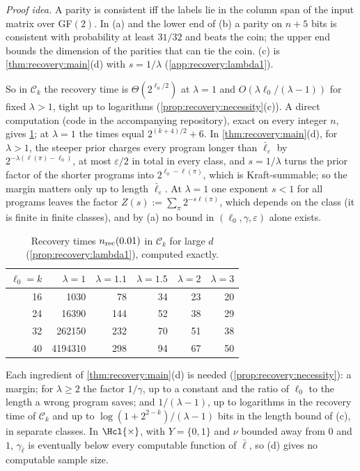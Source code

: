 \emph{Proof idea.} A parity is consistent iff the labels lie in the column span of the input matrix over GF$(2)$. In (a) and the lower end of (b) a parity on $n+5$ bits is consistent with probability at least $31/32$ and beats the coin; the upper end bounds the dimension of the parities that can tie the coin. (c) is \cref{thm:recovery:main}(d) with $s=1/\lambda$ (\cref{app:recovery:lambda1}).

So in $\mathcal C_k$ the recovery time is $\Theta(2^{\ell_0/2})$ at $\lambda=1$ and $O(\lambda\ell_0/(\lambda-1))$ for fixed $\lambda>1$, tight up to logarithms (\cref{prop:recovery:necessity}(c)). A direct computation (code in the accompanying repository), exact on every integer $n$, gives \cref{tab:recovery:times}; at $\lambda=1$ the times equal $2^{(k+4)/2}+6$. In \cref{thm:recovery:main}(d), for $\lambda>1$, the steeper prior charges every program longer than $\bar\ell_\varepsilon$ by $2^{-\lambda(\ell(\pi)-\ell_0)}$, at most $\varepsilon/2$ in total in every class, and $s=1/\lambda$ turns the prior factor of the shorter programs into $2^{\ell_0-\ell(\pi)}$, which is Kraft-summable; so the margin matters only up to length $\bar\ell_\varepsilon$. At $\lambda=1$ one exponent $s<1$ for all programs leaves the factor $Z(s):=\sum_\pi2^{-s\ell(\pi)}$, which depends on the class (it is finite in finite classes), and by (a) no bound in $(\ell_0,\gamma,\varepsilon)$ alone exists.

\begin{table}[ht]\centering\small
\caption{Recovery times $n_{\rm rec}(0.01)$ in $\mathcal C_k$ for large $d$ (\cref{prop:recovery:lambda1}), computed exactly.}\label{tab:recovery:times}
\begin{tabular}{@{}rrrrrr@{}}\toprule
$\ell_0=k$ & $\lambda=1$ & $\lambda=1.1$ & $\lambda=1.5$ & $\lambda=2$ & $\lambda=3$\\\midrule
16 & 1030 & 78 & 34 & 23 & 20\\
24 & 16390 & 144 & 52 & 38 & 29\\
32 & 262150 & 232 & 70 & 51 & 38\\
40 & 4194310 & 298 & 94 & 67 & 50\\\bottomrule
\end{tabular}
\end{table}

Each ingredient of \cref{thm:recovery:main}(d) is needed (\cref{prop:recovery:necessity}): a margin; for $\lambda\ge2$ the factor $1/\gamma$, up to a constant and the ratio of $\ell_0$ to the length a wrong program saves; and $1/(\lambda-1)$, up to logarithms in the recovery time of $\mathcal C_k$ and up to $\log(1+2^{2-k})/(\lambda-1)$ bits in the length bound of (c), in separate classes. In $\Hcl{\times}$, with $Y=\{0,1\}$ and $\nu$ bounded away from $0$ and $1$, $\gamma_{\bar\ell}$ is eventually below every computable function of $\bar\ell$, so (d) gives no computable sample size.

